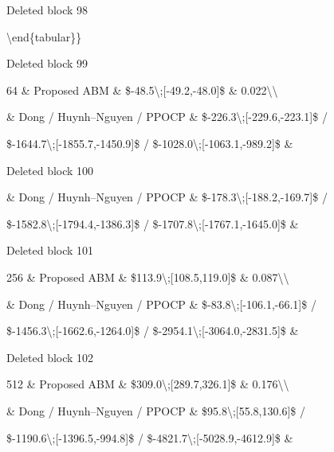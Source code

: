 \documentclass[a4paper,fleqn]{cas-dc}
\newenvironment{RevisionDeletion}{%
  \par\begingroup\color{revisionred}\footnotesize\ttfamily
  \setlength{\parindent}{0pt}\setlength{\parskip}{1pt}\obeyspaces
}{\par\endgroup}
\begin{document}
\begin{RevisionDeletion}
Deleted block 98\par
\textbackslash{}end\{tabular\}\}\par
\end{RevisionDeletion}

\begin{RevisionDeletion}
Deleted block 99\par
64 \& Proposed ABM \& \$-48.5\textbackslash{};[-49.2,-48.0]\$ \& 0.022\textbackslash{}\textbackslash{}\par
   \& Dong / Huynh--Nguyen / PPOCP \& \$-226.3\textbackslash{};[-229.6,-223.1]\$ /\par
   \$-1644.7\textbackslash{};[-1855.7,-1450.9]\$ / \$-1028.0\textbackslash{};[-1063.1,-989.2]\$ \&\par
\end{RevisionDeletion}

\begin{RevisionDeletion}
Deleted block 100\par
   \& Dong / Huynh--Nguyen / PPOCP \& \$-178.3\textbackslash{};[-188.2,-169.7]\$ /\par
   \$-1582.8\textbackslash{};[-1794.4,-1386.3]\$ / \$-1707.8\textbackslash{};[-1767.1,-1645.0]\$ \&\par
\end{RevisionDeletion}

\begin{RevisionDeletion}
Deleted block 101\par
256 \& Proposed ABM \& \$113.9\textbackslash{};[108.5,119.0]\$ \& 0.087\textbackslash{}\textbackslash{}\par
   \& Dong / Huynh--Nguyen / PPOCP \& \$-83.8\textbackslash{};[-106.1,-66.1]\$ /\par
   \$-1456.3\textbackslash{};[-1662.6,-1264.0]\$ / \$-2954.1\textbackslash{};[-3064.0,-2831.5]\$ \&\par
\end{RevisionDeletion}

\begin{RevisionDeletion}
Deleted block 102\par
512 \& Proposed ABM \& \$309.0\textbackslash{};[289.7,326.1]\$ \& 0.176\textbackslash{}\textbackslash{}\par
   \& Dong / Huynh--Nguyen / PPOCP \& \$95.8\textbackslash{};[55.8,130.6]\$ /\par
   \$-1190.6\textbackslash{};[-1396.5,-994.8]\$ / \$-4821.7\textbackslash{};[-5028.9,-4612.9]\$ \&\par
\end{RevisionDeletion}
\end{document}
